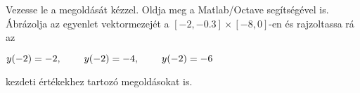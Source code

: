 Vezesse le a 
\de{} megoldását kézzel. 
Oldja meg a Matlab/Octave   segítségével is. 
Ábrázolja az egyenlet vektormezejét a $[-2,-0.3]\times [-8,0]$-en és rajzoltassa rá 
az 
\centerline{$y(-2)=-2, \hspace{0.8cm} y(-2)=-4, \hspace{0.8cm} y(-2)=-6$} 
kezdeti értékekhez tartozó megoldásokat is.


